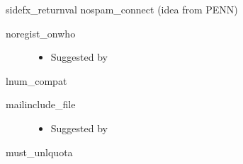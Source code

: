 \documentclass[letterpaper,10pt,english]{sphinxmanual}
\begin{document}
\sphinxAtStartPar
sidefx\_returnval
nospam\_connect (idea from PENN)
\begin{description}
\item[{noregist\_onwho}] \leavevmode\begin{itemize}
\item {} 
\sphinxAtStartPar
Suggested by 

\end{itemize}

\end{description}

\sphinxAtStartPar
lnum\_compat
\begin{description}
\item[{mailinclude\_file}] \leavevmode\begin{itemize}
\item {} 
\sphinxAtStartPar
Suggested by 

\end{itemize}

\end{description}

\sphinxAtStartPar
must\_unlquota
\end{document}
